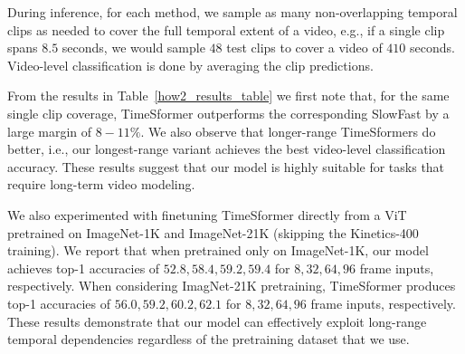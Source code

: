 \documentclass{article}
\begin{document}
During inference, for each method, we sample as many non-overlapping temporal clips as needed to cover the full temporal extent of a video, e.g., if a single clip spans $8.5$ seconds, we would sample $48$ test clips to cover a video of $410$ seconds. Video-level classification is done by averaging the clip predictions.



From the results in Table~\ref{how2_results_table} we first note that, for the same single clip coverage, TimeSformer outperforms the corresponding SlowFast by a large margin of $8-11\%$. We also observe that longer-range TimeSformers do better, i.e., our longest-range variant achieves the best video-level classification accuracy. These results suggest that our model is highly suitable for tasks that require long-term video modeling. 

We also experimented with finetuning TimeSformer directly from a ViT pretrained on ImageNet-1K and ImageNet-21K (skipping the Kinetics-400 training). We report that when pretrained only on ImageNet-1K, our model achieves top-1 accuracies of $52.8, 58.4, 59.2, 59.4$ for $8, 32, 64, 96$ frame inputs, respectively. When considering ImagNet-21K pretraining, TimeSformer produces  top-1 accuracies of $56.0, 59.2, 60.2, 62.1$ for $8, 32, 64, 96$ frame inputs, respectively. These results demonstrate that our model can effectively exploit long-range temporal dependencies regardless of the pretraining dataset that we use.



\end{document}
